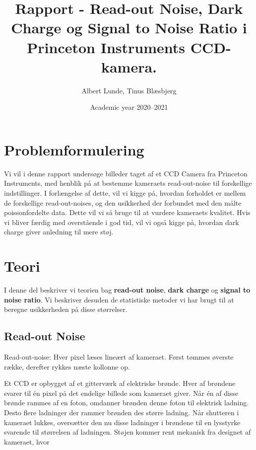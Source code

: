 \documentclass[working]{tuftebook}
\title{Rapport - Read-out Noise, Dark Charge og Signal to Noise Ratio i Princeton Instruments CCD-kamera.}
\author{Albert Lunde, Tinus Blæsbjerg}
\date{Academic year 2020--2021}
\begin{document}
\maketitle
\pagestyle{fancy}
\tableofcontents
\chapter*{Problemformulering}
Vi vil i denne rapport undersøge billeder taget af et CCD Camera fra Princeton Instruments, med henblik på at bestemme kameraets read-out-noise til forskellige indstillinger. I forlængelse af dette, vil vi kigge på, hvordan forholdet er mellem de forskellige read-out-noises, og den usikkerhed der forbundet med den målte poissonfordelte data. Dette vil vi så bruge til at vurdere kameraets kvalitet. Hvis vi bliver færdig med overstående i god tid, vil vi også kigge på, hvordan dark charge giver anledning til mere støj.

\chapter*{Teori}
I denne del beskriver vi teorien bag \textbf{read-out noise}, \textbf{dark charge} og \textbf{signal to noise ratio}. Vi beskriver desuden de statistiske metoder vi har brugt til at beregne usikkerheden på disse størrelser.
\section{Read-out Noise}
\begin{marginfigure}
    \centering
    \caption{Read-out-noise: Hver pixel læses lineært af kameraet. Først tømmes øverste række, derefter rykkes næste kollonne op.}
    \label{fig:read-out-noise}
\end{marginfigure}
Et CCD er opbygget af et gitterværk af elektriske brønde. Hver af brøndene svarer til én pixel på det endelige billede som kameraet giver. Når én af disse brønde rammes af en foton, omdanner brønden denne foton til elektrisk ladning. Desto flere ladninger der rammer brønden des større ladning. Når shutteren i kameraet lukkes, oversætter den nu disse ladninger i brøndene til en lysstyrke svarende til størrelsen af ladningen. Støjen kommer rent mekanisk fra designet af kameraet, hvor 
\end{document}
